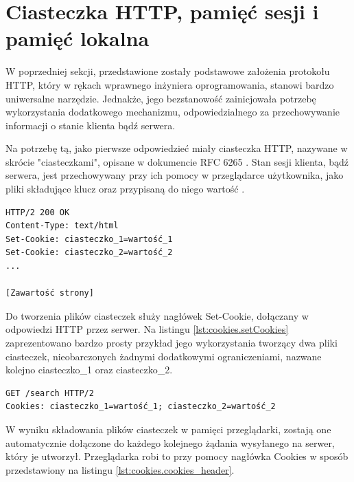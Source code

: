 \section{Ciasteczka HTTP, pamięć sesji i pamięć lokalna}

W poprzedniej sekcji, przedstawione zostały podstawowe założenia protokołu HTTP, który w rękach wprawnego inżyniera oprogramowania, stanowi bardzo uniwersalne narzędzie. Jednakże, jego bezstanowość zainicjowała potrzebę wykorzystania dodatkowego mechanizmu, odpowiedzialnego za przechowywanie informacji o stanie klienta bądź serwera.

Na potrzebę tą, jako pierwsze odpowiedzieć miały ciasteczka HTTP, nazywane w skrócie "ciasteczkami", opisane w dokumencie RFC 6265 \cite{cookies.rfc6265}. Stan sesji klienta, bądź serwera, jest przechowywany przy ich pomocy w przeglądarce użytkownika, jako pliki składujące klucz oraz przypisaną do niego wartość \cite{cookies.docs}.

\begin{lstlisting}[caption=Przykładowa odpowiedź HTTP wykorzystująca nagłówek Set-Cookie, label=lst:cookies.setCookies]
HTTP/2 200 OK
Content-Type: text/html
Set-Cookie: ciasteczko_1=wartość_1
Set-Cookie: ciasteczko_2=wartość_2
...

[Zawartość strony]
\end{lstlisting}

Do tworzenia plików ciasteczek służy nagłówek Set-Cookie, dołączany w odpowiedzi HTTP przez serwer. Na listingu \ref{lst:cookies.setCookies} zaprezentowano bardzo prosty przykład jego wykorzystania tworzący dwa pliki ciasteczek, nieobarczonych żadnymi dodatkowymi ograniczeniami, nazwane kolejno ciasteczko\_1 oraz ciasteczko\_2.

\begin{lstlisting}[caption=Przykładowe żądanie HTTP wykorzystujące nagłówek Cookies, label=lst:cookies.cookies_header]
GET /search HTTP/2
Cookies: ciasteczko_1=wartość_1; ciasteczko_2=wartość_2
\end{lstlisting}

W wyniku składowania plików ciasteczek w pamięci przeglądarki, zostają one automatycznie dołączone do każdego kolejnego żądania wysyłanego na serwer, który je utworzył. Przeglądarka robi to przy pomocy nagłówka Cookies w sposób przedstawiony na listingu \ref{lst:cookies.cookies_header}.

